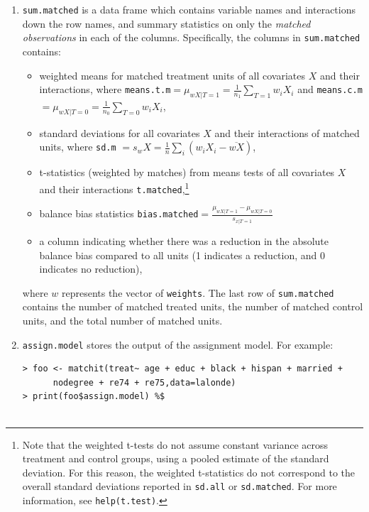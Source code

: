 \documentclass[oneside,letterpaper,titlepage]{article}
\begin{document}
\begin{enumerate}
\item \texttt{sum.matched} is a data frame  
  which contains variable names
  and interactions down the row names, and summary statistics on only
  the  \emph{matched observations} in each of the
  columns.  Specifically, the columns in \texttt{sum.matched} contains:
  \begin{itemize}
  \item weighted means for matched treatment units of all covariates $X$ and their
    interactions, where \texttt{means.t.m}$= \mu_{wX|T=1} =
    \frac{1}{n_1} \sum_{T=1} w_iX_i$ and
    \texttt{means.c.m}$=\mu_{wX|T=0} = \frac{1}{n_0} \sum_{T=0} w_iX_i$,
  \item standard deviations for all covariates $X$ and their
    interactions of matched units, where
    \texttt{sd.m} $= s_wX = \frac{1}{n} \sum_{i} (w_iX_i - \overline{wX})$,
  \item t-statistics (weighted by matches) from means tests of all covariates $X$ and their
    interactions \texttt{t.matched},\footnote{Note that the weighted t-tests do
      not assume constant variance across treatment and control
      groups, using a pooled estimate of the standard deviation.  For
      this reason, the weighted t-statistics do not correspond to the overall standard
      deviations reported in \texttt{sd.all} or \texttt{sd.matched}.
      For more information, see \texttt{help(t.test)}.}
  \item balance bias statistics
  \texttt{bias.matched}$=\frac{\mu_{wX|T=1} -
  \mu_{wX|T=0}}{s_{x|T=1}}$
  \item a column indicating whether there was a reduction in the
  absolute balance bias compared to all units (1 indicates a
  reduction, and 0 indicates no reduction),
  \end{itemize}
  
  where $w$ represents the vector of \texttt{weights}.   The last row
  of \texttt{sum.matched} contains the number of matched treated units, the
  number of matched control units, and the total number of matched units. 

\item \texttt{assign.model} stores the output of the assignment
  model.  For example: 
  
  \begin{footnotesize}
\begin{verbatim}
> foo <- matchit(treat~ age + educ + black + hispan + married +
      nodegree + re74 + re75,data=lalonde)
> print(foo$assign.model) %$


\end{verbatim}
\end{footnotesize}
\end{enumerate}
\end{document}

